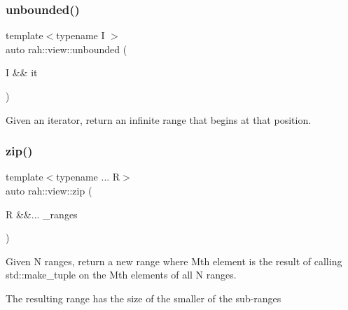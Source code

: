 \subsubsection{\texorpdfstring{unbounded()}{unbounded()}}
{\footnotesize\ttfamily template$<$typename I $>$ \\
auto rah\+::view\+::unbounded (\begin{DoxyParamCaption}\item[{I \&\&}]{it }\end{DoxyParamCaption})}



Given an iterator, return an infinite range that begins at that position. 


\begin{DoxyCodeInclude}{0}
\end{DoxyCodeInclude}
\mbox{\label{namespacerah_1_1view_a26c5da9052b94179d6ad8614ea2b9fda}} 
\subsubsection{\texorpdfstring{zip()}{zip()}}
{\footnotesize\ttfamily template$<$typename ... R$>$ \\
auto rah\+::view\+::zip (\begin{DoxyParamCaption}\item[{R \&\&...}]{\+\_\+ranges }\end{DoxyParamCaption})}



Given N ranges, return a new range where Mth element is the result of calling std\+::make\+\_\+tuple on the Mth elements of all N ranges. 

The resulting range has the size of the smaller of the sub-\/ranges


